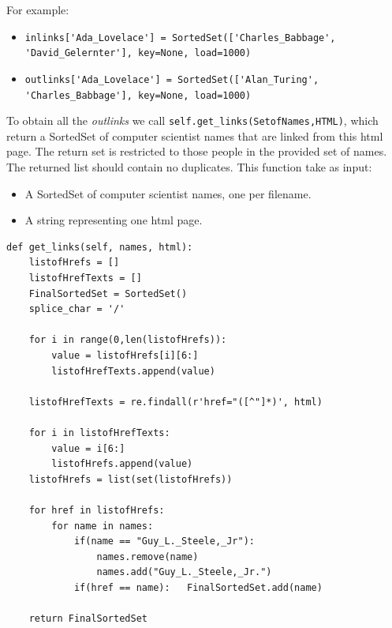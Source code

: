 \documentclass[12pt, twoside]{article}
\begin{document}
For example:
\begin{itemize}[noitemsep, topsep=0pt]
	\item \lstinline[language = iPython]{inlinks['Ada_Lovelace'] = SortedSet(['Charles_Babbage', 'David_Gelernter'], key=None, load=1000)}
	\item \lstinline[language = iPython]{outlinks['Ada_Lovelace'] = SortedSet(['Alan_Turing', 'Charles_Babbage'], key=None, load=1000)}
\end{itemize}
To obtain all the \textit{outlinks} we call \lstinline[language = iPython]{self.get_links(SetofNames,HTML)}, which return a SortedSet of computer scientist names that are linked from this html page. The return set is restricted to those people in the provided set of names. The returned list should contain no duplicates. This function take as input:
\begin{itemize}[noitemsep, topsep=0pt]
	\item	A SortedSet of computer scientist names, one per filename.
	\item	A string representing one html page.
\end{itemize}

\newpage

\begin{lstlisting}[language = iPython, caption={Get Links},captionpos=b]
def get_links(self, names, html):
	listofHrefs = []
	listofHrefTexts = []
	FinalSortedSet = SortedSet()
	splice_char = '/'

	for i in range(0,len(listofHrefs)):
		value = listofHrefs[i][6:]
		listofHrefTexts.append(value)

	listofHrefTexts = re.findall(r'href="([^"]*)', html)

	for i in listofHrefTexts:
		value = i[6:]
		listofHrefs.append(value)
	listofHrefs = list(set(listofHrefs))

	for href in listofHrefs:
		for name in names:
			if(name == "Guy_L._Steele,_Jr"):
				names.remove(name)
				names.add("Guy_L._Steele,_Jr.")
			if(href == name):	FinalSortedSet.add(name)

	return FinalSortedSet
\end{lstlisting}
\end{document}
